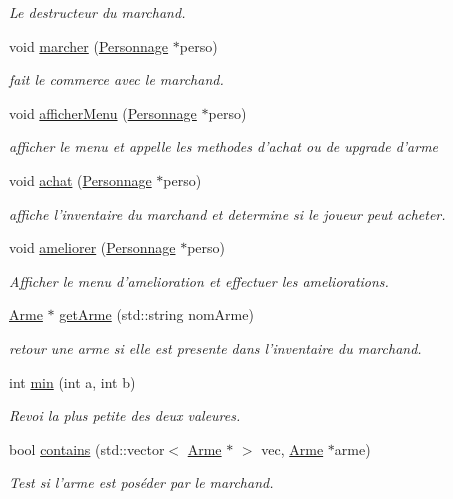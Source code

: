 \begin{DoxyCompactItemize}
\begin{DoxyCompactList}\small\item\em Le destructeur du marchand. \end{DoxyCompactList}\item 
void \hyperlink{classMarchand_a6e8fbc688e23a97d761359cb36801564}{marcher} (\hyperlink{classPersonnage}{Personnage} $\ast$perso)
\begin{DoxyCompactList}\small\item\em fait le commerce avec le marchand. \end{DoxyCompactList}\item 
void \hyperlink{classMarchand_afec086e17a2df2c16f730a7b22c04fd9}{afficher\-Menu} (\hyperlink{classPersonnage}{Personnage} $\ast$perso)
\begin{DoxyCompactList}\small\item\em afficher le menu et appelle les methodes d'achat ou de upgrade d'arme \end{DoxyCompactList}\item 
void \hyperlink{classMarchand_afa159699ab3a8f374f67775f3f0f2d56}{achat} (\hyperlink{classPersonnage}{Personnage} $\ast$perso)
\begin{DoxyCompactList}\small\item\em affiche l'inventaire du marchand et determine si le joueur peut acheter. \end{DoxyCompactList}\item 
void \hyperlink{classMarchand_a0346e8673ad63cc9ff3d49e805c25645}{ameliorer} (\hyperlink{classPersonnage}{Personnage} $\ast$perso)
\begin{DoxyCompactList}\small\item\em Afficher le menu d'amelioration et effectuer les ameliorations. \end{DoxyCompactList}\item 
\hyperlink{classArme}{Arme} $\ast$ \hyperlink{classMarchand_ab91a5c2933a62a05d2c0a4926fcaadd0}{get\-Arme} (std\-::string nom\-Arme)
\begin{DoxyCompactList}\small\item\em retour une arme si elle est presente dans l'inventaire du marchand. \end{DoxyCompactList}\item 
int \hyperlink{classMarchand_aa3167b6744857b841091896e8e791383}{min} (int a, int b)
\begin{DoxyCompactList}\small\item\em Revoi la plus petite des deux valeures. \end{DoxyCompactList}\item 
bool \hyperlink{classMarchand_a939b005d84cce6fd81adaa037025eb51}{contains} (std\-::vector$<$ \hyperlink{classArme}{Arme} $\ast$ $>$ vec, \hyperlink{classArme}{Arme} $\ast$arme)
\begin{DoxyCompactList}\small\item\em Test si l'arme est poséder par le marchand. \end{DoxyCompactList}\end{DoxyCompactItemize}


